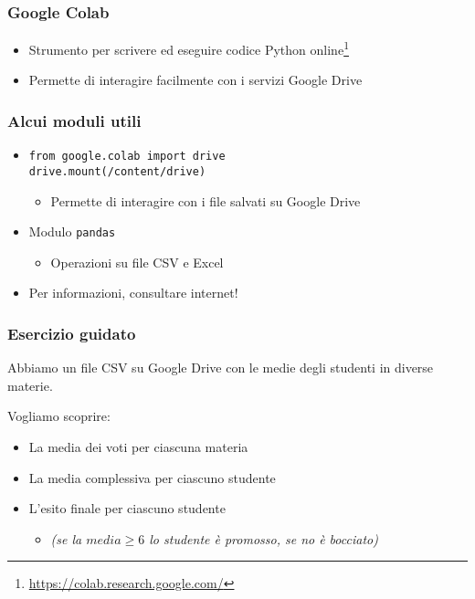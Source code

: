
\begin{contentframe}
    \frametitle{Google Colab}

    \begin{itemize}
        \item Strumento per scrivere ed eseguire codice Python online\footnote[frame]{\url{https://colab.research.google.com/}}
        \bigskip
        \item Permette di interagire facilmente con i servizi Google Drive
    \end{itemize}
\end{contentframe}

\begin{exampleframe}
    \frametitle{Alcui moduli utili}

    \begin{itemize}
        \item \texttt{from google.colab import drive}\\
            \texttt{drive.mount(\textquotesingle{}/content/drive\textquotesingle{})}
        \begin{itemize}
            \item Permette di interagire con i file salvati su Google Drive
        \end{itemize}

        \bigskip
        \item Modulo \texttt{pandas}
        \begin{itemize}
            \item Operazioni su file CSV e Excel
        \end{itemize}

        \bigskip
        \item Per informazioni, consultare internet! 
    \end{itemize}
\end{exampleframe}

\begin{exerciseframe}
    \frametitle{Esercizio guidato}

    Abbiamo un file CSV su Google Drive con le medie degli studenti in diverse materie.
    
    Vogliamo scoprire:
    \begin{itemize}
        \item La media dei voti per ciascuna materia
        \item La media complessiva per ciascuno studente
        \item L'esito finale per ciascuno studente
        \begin{itemize}
            \item \textit{(se la $media \geq 6$ lo studente è promosso, se no è bocciato)}
        \end{itemize}
    \end{itemize}
\end{exerciseframe}

